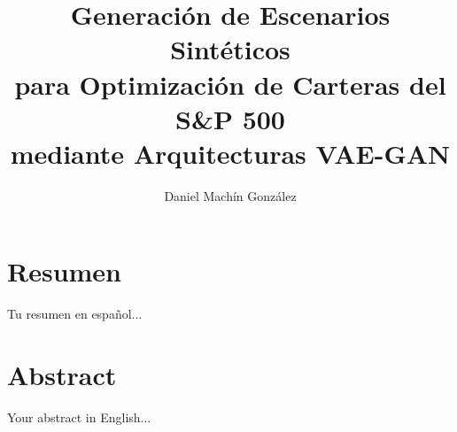 \documentclass[11pt,a4paper,spanish]{book}
\title{Generación de Escenarios Sintéticos\\para \mbox{Optimización} de Carteras del S\&P 500\\mediante Arquitecturas VAE-GAN}
\author{Daniel Machín González}
\date{\spanishdate{\year}{\month}{\day}}
\begin{document}
\maketitle

\frontmatter
\tableofcontents
\listoffigures
\listoftables

\chapter{Resumen}
Tu resumen en español...
\chapter{Abstract}
Your abstract in English...

\mainmatter









\backmatter

\renewcommand{\bibname}{Referencias bibliográficas}

\end{document}
